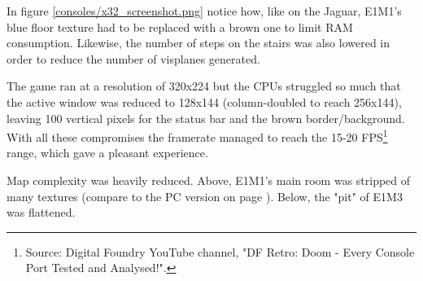 In figure \ref{consoles/x32_screenshot.png} notice how, like on the Jaguar, E1M1's blue floor texture had to be replaced with a brown one to limit RAM consumption. Likewise, the number of steps on the stairs was also lowered in order to reduce the number of visplanes generated.\\
\par
The game ran at a resolution of 320x224 but the CPUs struggled so much that the active window was reduced to 128x144 (column-doubled to reach 256x144), leaving 100 vertical pixels for the status bar and the brown border/background. With all these compromises the framerate managed to reach the 15-20 FPS\footnote{Source: Digital Foundry YouTube channel, "DF Retro: Doom - Every Console Port Tested and Analysed!".} range, which gave a pleasant experience.\\
\par
{}



\par
Map complexity was heavily reduced. Above, E1M1's main room was stripped of many textures (compare to the PC version on page \pageref{complex_scene_plain_light.png}). Below, the "pit" of E1M3 was flattened.\\
\par
{}






